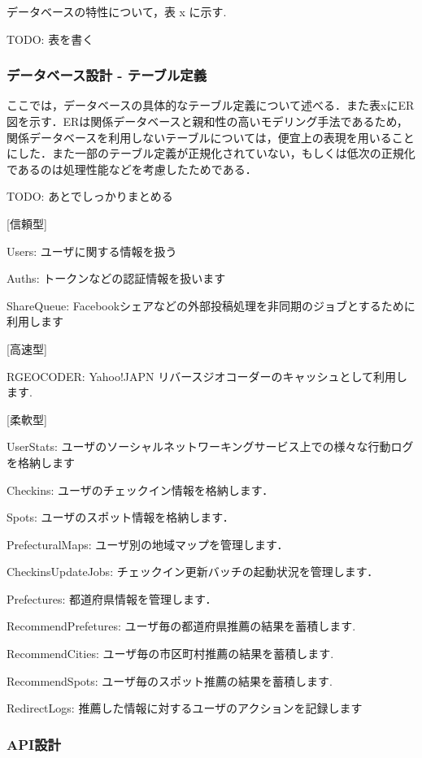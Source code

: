 \documentclass{jsarticle}
\begin{document}
データベースの特性について，表 x に示す.

TODO: 表を書く

\subsubsection{データベース設計 - テーブル定義}

ここでは，データベースの具体的なテーブル定義について述べる．また表xにER図を示す．ERは関係データベースと親和性の高いモデリング手法であるため，関係データベースを利用しないテーブルについては，便宜上の表現を用いることにした．また一部のテーブル定義が正規化されていない，もしくは低次の正規化であるのは処理性能などを考慮したためである．

TODO: あとでしっかりまとめる

[信頼型]

Users: ユーザに関する情報を扱う

Auths: トークンなどの認証情報を扱います

ShareQueue: Facebookシェアなどの外部投稿処理を非同期のジョブとするために利用します



[高速型]

RGEOCODER: Yahoo!JAPN リバースジオコーダーのキャッシュとして利用します.


[柔軟型]

UserStats: ユーザのソーシャルネットワーキングサービス上での様々な行動ログを格納します


Checkins: ユーザのチェックイン情報を格納します．

Spots: ユーザのスポット情報を格納します．

PrefecturalMaps: ユーザ別の地域マップを管理します．

CheckinsUpdateJobs: チェックイン更新バッチの起動状況を管理します．

Prefectures: 都道府県情報を管理します．

RecommendPrefetures: ユーザ毎の都道府県推薦の結果を蓄積します.

RecommendCities: ユーザ毎の市区町村推薦の結果を蓄積します.

RecommendSpots: ユーザ毎のスポット推薦の結果を蓄積します.

RedirectLogs: 推薦した情報に対するユーザのアクションを記録します

\subsubsection{API設計}
\end{document}
